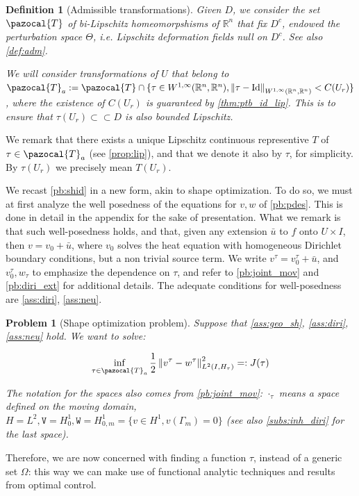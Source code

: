 \documentclass[english,a4paper,9pt,oneside]{scrbook}	%
\theoremstyle{break}
\newtheorem{defn}[equation]{Definition}
\newtheorem{pb}[equation]{Problem}
\theoremstyle{remark}
\newcommand{\mR}{\mathbb{R}}
\newcommand{\norm}[1]{\left\lVert#1\right\rVert}
\newcommand{\cc}{\subset\subset}
\newcommand{\cT}{\pazocal{T}}
\newcommand{\id}{\text{Id}}
\newcommand{\Te}{\Theta}
\newcommand{\tw}[1]{\texttt{#1}}
\begin{document}
\begin{defn}[Admissible transformations]

Given $D$, we consider the set $\cT$ of bi-Lipschitz homeomorpshisms of $\mR^n$ that fix $D^c$, endowed the perturbation space $\Te$, i.e. Lipschitz deformation fields null on $D^c$. See also \cref{def:adm}.

We will consider transformations of $U$ that belong to $\cT_a:=\cT \cap \{ \tau \in W^{1,\infty}(\mR^n, \mR^n), \norm{\tau - \id}_{W^{1,\infty}(\mR^n, \mR^n)}<C(U_r)\}$, where the existence of $C(U_r)$ is guaranteed by \cref{thm:ptb_id_lip}. This is to ensure that $\tau(U_r)\cc D$ is also bounded Lipschitz.


\end{defn}

We remark that there exists a unique Lipschitz continuous representive $T$ of $\tau \in \cT_a$ (see \cref{prop:lip}), and that we denote it also by $\tau$, for simplicity. By $\tau(U_r)$ we precisely mean $T(U_r)$.

We recast \cref{pb:shid} in a new form, akin to shape optimization. To do so, we must at first analyze the well posedness of the equations for $v,w$ of \cref{pb:pdes}. This is done in detail in the appendix for the sake of presentation. What we remark is that such well-posedness holds, and that, given any extension $\bar{u}$ to $f$ onto $U\times I$, then $v = v_0+\bar{u}$, where $v_0$ solves the heat equation with homogeneous Dirichlet boundary conditions, but a non trivial source term. We write $v^\tau = v_0^\tau + \bar{u}$, and $v_0^\tau, w_\tau$ to emphasize the dependence on $\tau$, and refer to \cref{pb:joint_mov} and \cref{pb:diri_ext} for additional details. The adequate conditions for well-posedness are \cref{ass:diri}, \cref{ass:neu}.

\begin{pb}[Shape optimization problem]
\label{pb:shopt}
Suppose that \cref{ass:geo_sh}, \cref{ass:diri}, \cref{ass:neu} hold. We want to solve:

$$\inf_{\tau \in \cT_a}\frac{1}{2}\norm{v^\tau-w^\tau}_{L^2(I,H_\tau)}^2=:J(\tau)$$

The notation for the spaces also comes from  \cref{pb:joint_mov}: $\cdot_\tau$ means a space defined on the moving domain, $H=L^2, \tw{V}=H^1_0, \tw{W} = H^1_{0,m}=\{v \in H^1, v(\Gamma_m)=0\}$ (see also \cref{subs:inh_diri} for the last space).

\end{pb}

Therefore, we are now concerned with finding a function $\tau$, instead of a generic set $\Omega$: this way we can make use of functional analytic techniques and results from optimal control.
\end{document}
